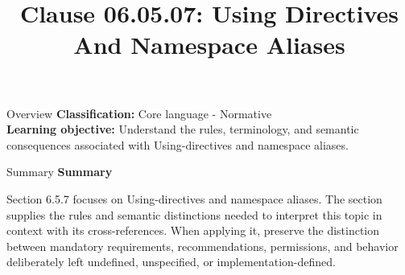 \documentclass[10pt,letterpaper]{article}
\title{Clause 06.05.07: Using Directives And Namespace Aliases}
\author{}
\date{}
\begin{document}
\maketitle
\begin{CornellOverviewBox}{Overview}
\textbf{Classification:} Core language - Normative\\[2pt]
\textbf{Learning objective:} Understand the rules, terminology, and semantic consequences associated with Using-directives and namespace aliases.
\end{CornellOverviewBox}\begin{CornellSummaryBox}{Summary}
{\sffamily\bfseries\color{Accent} Summary}\par\vspace{3pt}Section 6.5.7 focuses on Using-directives and namespace aliases. The section supplies the rules and semantic distinctions needed to interpret this topic in context with its cross-references. When applying it, preserve the distinction between mandatory requirements, recommendations, permissions, and behavior deliberately left undefined, unspecified, or implementation-defined.
\end{CornellSummaryBox}
\end{document}
